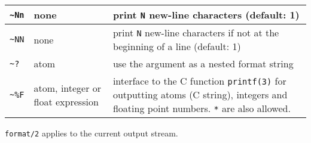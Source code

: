 \begin{tabular}{|C{1.4cm}|C{2.8cm}|p{10.45cm}|}
\texttt{\~{}Nn} & none & print \texttt{N} new-line characters (default: 1) \\

\hline

\texttt{\~{}NN} & none & print \texttt{N} new-line characters if not at the beginning
of a line (default: 1) \\

\hline

\texttt{\~{}?} & atom & use the argument as a nested format string \\

\hline

\texttt{\~{}\%F} & atom, integer or float expression & interface to the C function
                                                   \texttt{printf(3)} for outputting
                                                   atoms (C string), integers and
                                                   floating point numbers.
                                                   \texttt{*} are also allowed. \\

\hline
\end{tabular}

\texttt{format/2} applies to the current output stream.

